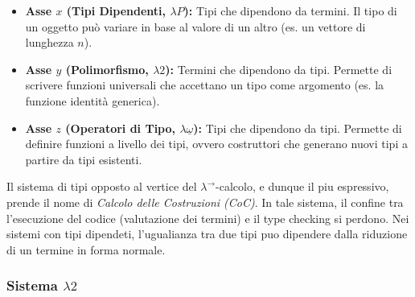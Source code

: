 \begin{itemize}
    \item \textbf{Asse $x$ (Tipi Dipendenti, \texorpdfstring{$\lambda P$}{LP}):}  
        Tipi che dipendono da termini. Il tipo di un oggetto può variare in base al valore di un altro (es. un vettore di lunghezza $n$).
    \item \textbf{Asse $y$ (Polimorfismo, \texorpdfstring{$\lambda 2$}{L2}):} 
        Termini che dipendono da tipi. Permette di scrivere funzioni universali che accettano un tipo come argomento (es. la funzione identità generica).
    \item \textbf{Asse $z$ (Operatori di Tipo, \texorpdfstring{$\lambda \underline{\omega}$}{L-omega}):}  Tipi che dipendono da tipi.
        Permette di definire funzioni a livello dei tipi, ovvero costruttori che generano nuovi tipi a partire da tipi esistenti. 
\end{itemize}
Il sistema di tipi opposto al vertice del $\lambda^{\to}$-calcolo, e dunque il piu espressivo, prende il nome di \emph{Calcolo delle Costruzioni (CoC)}. 
In tale sistema, il confine tra l'esecuzione del codice (valutazione dei termini) e il type checking si perdono. Nei sistemi con tipi dipendeti, l'ugualianza 
tra due tipi puo dipendere dalla riduzione di un termine in forma normale. 

\subsubsection{Sistema \texorpdfstring{$\lambda 2$}{L2}}

